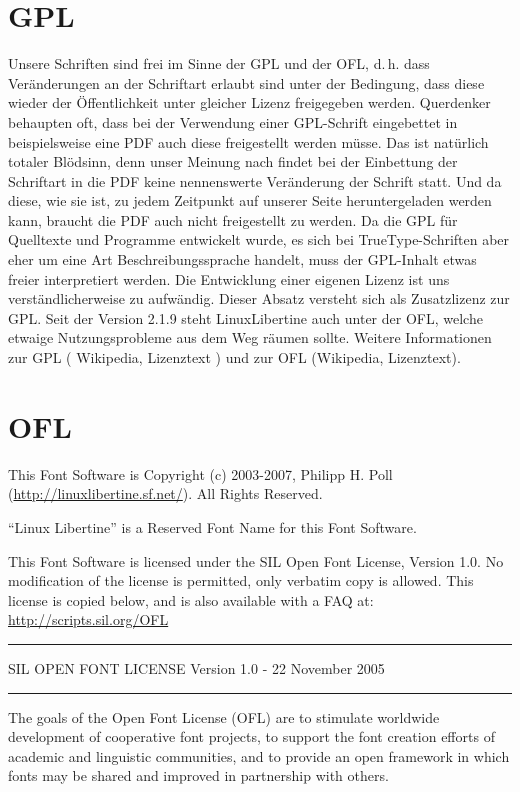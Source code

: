 \documentclass{fontdokuold}
\begin{document}
\section{GPL}

Unsere Schriften sind frei im Sinne der GPL und der OFL, d.\,h. dass
Veränderungen an der Schriftart erlaubt sind unter der Bedingung, dass diese
wieder der Öffentlichkeit unter gleicher Lizenz freigegeben werden. Querdenker
behaupten oft, dass bei der Verwendung einer GPL-Schrift eingebettet in
beispielsweise eine PDF auch diese freigestellt werden müsse. Das ist natürlich
totaler Blödsinn, denn unser Meinung nach findet bei der Einbettung der
Schriftart in die PDF keine nennenswerte Veränderung der Schrift statt. Und da
diese, wie sie ist, zu jedem Zeitpunkt auf unserer Seite heruntergeladen werden
kann, braucht die PDF auch nicht freigestellt zu werden. Da die GPL für
Quelltexte und Programme entwickelt wurde, es sich bei TrueType-Schriften aber
eher um eine Art Beschreibungssprache handelt, muss der GPL-Inhalt etwas freier
interpretiert werden. Die Entwicklung einer eigenen Lizenz ist uns
verständlicherweise zu aufwändig. Dieser Absatz versteht sich als Zusatzlizenz
zur GPL. Seit der Version 2.1.9 steht LinuxLibertine auch unter der OFL, welche
etwaige Nutzungsprobleme aus dem Weg räumen sollte. Weitere Informationen zur
GPL ( Wikipedia, Lizenztext ) und zur OFL (Wikipedia, Lizenztext).


\section{OFL}

This Font Software is Copyright (c) 2003-2007, Philipp H. Poll (\url{http://linuxlibertine.sf.net/}).
All Rights Reserved.

"`Linux Libertine"' is a Reserved Font Name for this Font Software.

This Font Software is licensed under the SIL Open Font License, Version 1.0.
No modification of the license is permitted, only verbatim copy is allowed.
This license is copied below, and is also available with a FAQ at:
\url{http://scripts.sil.org/OFL}
\bigskip

\hrule\bigskip
SIL OPEN FONT LICENSE Version 1.0 - 22 November 2005\bigskip
\hrule\bigskip


The goals of the Open Font License (OFL) are to stimulate worldwide
development of cooperative font projects, to support the font creation
efforts of academic and linguistic communities, and to provide an open
framework in which fonts may be shared and improved in partnership with
others.
\end{document}
